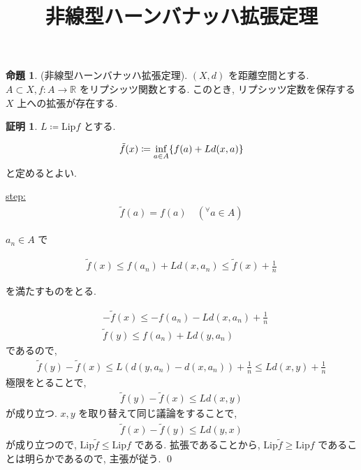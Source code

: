 \documentclass[10pt, fleqn, label-section=none]{bxjsarticle}
\title{非線型ハーンバナッハ拡張定理}
\date{}
\author{}
\theoremstyle{definition}
\newtheorem{prop}[dfn]{命題}
\newtheorem*{pf*}{証明}
\newcommand{\any}{{}^{\forall}}
\newcommand{\cbra}[1]{\mleft\{#1\mright\}}
\newcommand{\Lip}{\textrm{Lip}}
\renewcommand{\;}{\, ; \,}
\newenvironment{claim}[1]{\par\noindent\underline{step:}\space#1}{}
\newenvironment{claimproof}[1]{\par\noindent{($\because$)}\space#1}{\hfill $\blacktriangle $}
\begin{document}
\maketitle

\section{}

\begin{prop}(非線型ハーンバナッハ拡張定理). $(X, d)$ を距離空間とする. $A \subset X, f: A \rightarrow \mathbb R$ をリプシッツ関数とする. このとき, リプシッツ定数を保存する$X$ 上への拡張が存在する. 

\end{prop}
\begin{pf*}$L \coloneqq \Lip f $ とする. 

\begin{align*} \tilde f (x) \coloneqq \inf_{a \in A} \cbra{ f(a) + L d(x, a)} \end{align*}
と定めるとよい. 

\begin{claim}
\begin{align*} \tilde f(a) = f(a) \quad  (\any a \in A)   \end{align*}
\end{claim}

$a_n \in A$ で

\begin{align*} \tilde f (x) \leq f(a_n) + L d(x, a_n)   \leq \tilde f(x) +  \frac{1}{n}  \end{align*}

を満たすものをとる. 

\begin{align*} &- \tilde f (x) \leq - f(a_n) - L d(x, a_n) + \frac{1}{n}   \\&\tilde f(y) \leq f(a_n) + L d(y, a_n) \end{align*}
であるので, 
\begin{align*} \tilde f (y) - \tilde f(x) \leq L (d(y, a_n) - d(x, a_n)) + \frac{1}{n} \leq Ld(x, y)+ \frac{1}{n}  \end{align*}
極限をとることで, 
\begin{align*}  \tilde f (y) - \tilde f(x) \leq L d(x, y)\end{align*}
が成り立つ. $x, y$ を取り替えて同じ議論をすることで, 
\begin{align*}  \tilde f (x) - \tilde f(y) \leq L d(y, x)\end{align*}
が成り立つので, $\Lip \tilde f \leq \Lip f$ である. 拡張であることから, $\Lip \tilde f \geq \Lip f$ であることは明らかであるので, 主張が従う. 
\qed
\end{pf*}
\end{document}
